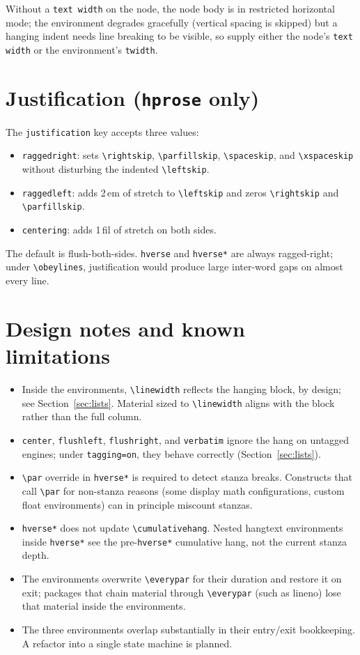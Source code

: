 \documentclass[11pt, twoside, openany]{article}
\newcommand{\pkg}[1]{\textsf{#1}}
\newcommand{\opt}[1]{\texttt{#1}}
\newcommand{\env}[1]{\texttt{#1}}
\newcommand{\cs}[1]{\texttt{\textbackslash #1}}
\begin{document}
Without a \texttt{text width} on the node, the node body is in restricted horizontal mode; the environment degrades gracefully (vertical spacing is skipped) but a hanging indent needs line breaking to be visible, so supply either the node's \texttt{text width} or the environment's \opt{twidth}.

\section{Justification (\env{hprose} only)}

The \opt{justification} key accepts three values:

\begin{itemize}
  \item \opt{raggedright}: sets \cs{rightskip}, \cs{parfillskip}, \cs{spaceskip}, and \cs{xspaceskip} without disturbing the indented \cs{leftskip}.
  \item \opt{raggedleft}: adds 2\,em of stretch to \cs{leftskip} and zeros \cs{rightskip} and \cs{parfillskip}.
  \item \opt{centering}: adds 1\,fil of stretch on both sides.
\end{itemize}

The default is flush-both-sides. \env{hverse} and \env{hverse*} are always ragged-right; under \cs{obeylines}, justification would produce large inter-word gaps on almost every line.

\section{Design notes and known limitations}

\begin{itemize}
  \item Inside the environments, \cs{linewidth} reflects the hanging block, by design; see Section~\ref{sec:lists}. Material sized to \cs{linewidth} aligns with the block rather than the full column.
  \item \env{center}, \env{flushleft}, \env{flushright}, and \env{verbatim} ignore the hang on untagged engines; under \opt{tagging=on}, they behave correctly (Section~\ref{sec:lists}).
  \item \cs{par} override in \env{hverse*} is required to detect stanza breaks. Constructs that call \cs{par} for non-stanza reasons (some display math configurations, custom float environments) can in principle miscount stanzas.
  \item \env{hverse*} does not update \cs{cumulativehang}. Nested \pkg{hangtext} environments inside \env{hverse*} see the pre-\env{hverse*} cumulative hang, not the current stanza depth.
  \item The environments overwrite \cs{everypar} for their duration and restore it on exit; packages that chain material through \cs{everypar} (such as \pkg{lineno}) lose that material inside the environments.
  \item The three environments overlap substantially in their entry/exit bookkeeping. A refactor into a single state machine is planned.
\end{itemize}


\printbibliography
\end{document}
